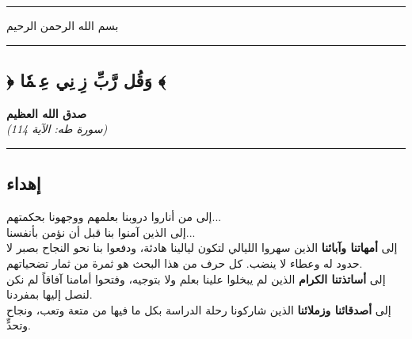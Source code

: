 \documentclass[12pt, a4paper]{report}
\begin{document}
\vspace{0.5cm}\hrule\vspace{0.5cm}
\newpage

\begin{center}

بسم الله الرحمن الرحيم \\

\vspace{0.5cm}\hrule\vspace{0.5cm}

\section*{﴿ وَقُل رَّبِّ زِدۡنِي عِلۡمٗا ﴾}

\textbf{صدق الله العظيم} \\

\textit{(سورة طه: الآية 114)} \\

\end{center}

\vspace{0.5cm}\hrule\vspace{0.5cm}
\newpage

\begin{center}

\chapter*{إهداء}

\end{center}

إلى من أناروا دروبنا بعلمهم ووجهونا بحكمتهم... \\
إلى الذين آمنوا بنا قبل أن نؤمن بأنفسنا... \\

إلى \textbf{أمهاتنا وآبائنا} الذين سهروا الليالي لتكون ليالينا هادئة، ودفعوا بنا نحو النجاح بصبر لا حدود له وعطاء لا ينضب. كل حرف من هذا البحث هو ثمرة من ثمار تضحياتهم. \\

إلى \textbf{أساتذتنا الكرام} الذين لم يبخلوا علينا بعلم ولا بتوجيه، وفتحوا أمامنا آفاقاً لم نكن لنصل إليها بمفردنا. \\

إلى \textbf{أصدقائنا وزملائنا} الذين شاركونا رحلة الدراسة بكل ما فيها من متعة وتعب، ونجاح وتحدٍّ. \\
\end{document}
